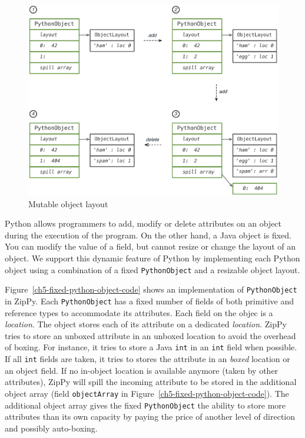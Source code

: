 \begin{figure}
\centering
\includegraphics[scale=.6]{figures/ch5-mutable-object-layout-change}
\caption{Mutable object layout}
\label{ch5-mutable-object-layout-change}
\end{figure}

Python allows programmers to add, modify or delete attributes on an object during the execution of the program.
On the other hand, a Java object is fixed.
You can modify the value of a field, but cannot resize or change the layout of an object.
We support this dynamic feature of Python by implementing each Python object using a combination of a fixed \texttt{PythonObject} and a resizable object layout.

Figure~\ref{ch5-fixed-python-object-code} shows an implementation of \texttt{PythonObject} in ZipPy.
Each \texttt{PythonObject} has a fixed number of fields of both primitive and reference types to accommodate its attributes.
Each field on the objec is a \emph{location}.
The object stores each of its attribute on a dedicated \emph{location}.
ZipPy tries to store an unboxed attribute in an unboxed location to avoid the overhead of boxing.
For instance, it tries to store a Java \texttt{int} in an \texttt{int} field when possible.
If all \texttt{int} fields are taken, it tries to stores the attribute in an \emph{boxed} location or an object field.
If no in-object location is available anymore (taken by other attributes), ZipPy will spill the incoming attribute to be stored in the additional object array (field \texttt{objectArray} in Figure~\ref{ch5-fixed-python-object-code}).
The additional object array gives the fixed \texttt{PythonObject} the ability to store more attributes than its own capacity by paying the price of another level of direction and possibly auto-boxing.

